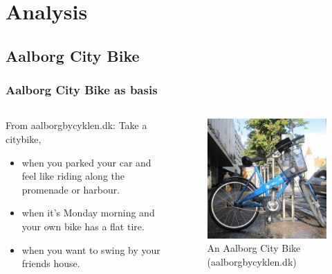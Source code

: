 \section{Analysis}

\subsection{Aalborg City Bike}

\begin{frame}
\frametitle{Aalborg City Bike as basis}
\begin{columns}
\begin{column}{.45\textwidth}
\begin{block}{From aalborgbycyklen.dk:}
Take a citybike,
\begin{itemize}
\item when you parked your car and feel like riding along the promenade or harbour.
\item when it's Monday morning and your own bike has a flat tire.
\item when you want to swing by your friends house.
\end{itemize}
\end{block}
\end{column}
\begin{column}{.45\textwidth}
\begin{figure}
\includegraphics[width=\textwidth]{graphics/acb_bike}
\caption{An Aalborg City Bike (aalborgbycyklen.dk)}
\end{figure}
\end{column}
\end{columns}
\end{frame}

